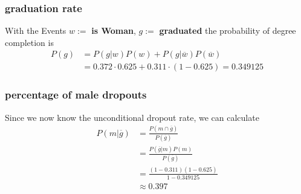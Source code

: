 \subsubsection{graduation rate}
With the Events $w:=$ \textbf{is Woman}, $g:=$ \textbf{graduated} the probability of degree completion is
\begin{align}
    P\left(g\right)&=P\left(g\vert w\right)P\left(w\right)+P\left(g\vert \overline{w}\right)P\left(\overline{w}\right)
    \\&= 0.372\cdot 0.625+0.311\cdot \left(1-0.625\right)=0.349125
\end{align}
\subsubsection{percentage of male dropouts}
Since we now know the unconditional dropout rate, we can calculate
\begin{align}
    P\left(m\vert \overline{g}\right) &= \frac{P\left(m\cap \overline{g}\right)}{P\left(\overline{g}\right)}
    \\&=\frac{P\left(\overline{g}\vert m\right)P\left(m\right)}{P\left(\overline{g}\right)}
    \\&=\frac{\left(1-0.311\right)\left(1-0.625\right)}{1-0.349125}
    \\&\approx 0.397
\end{align}
